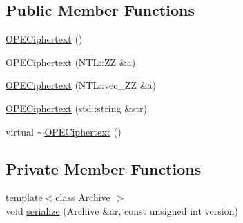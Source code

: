 \subsection*{Public Member Functions}
\begin{DoxyCompactItemize}
\item 
\hyperlink{classOPECiphertext_a03de322445edbdcd1439906f2d853dd0}{O\+P\+E\+Ciphertext} ()
\item 
\hyperlink{classOPECiphertext_a834af7de55af1ba2bb9621099dea4fa7}{O\+P\+E\+Ciphertext} (N\+T\+L\+::\+ZZ \&a)
\item 
\hyperlink{classOPECiphertext_af47076c8c0eb9cdccd0d3ad50140183d}{O\+P\+E\+Ciphertext} (N\+T\+L\+::vec\+\_\+\+ZZ \&a)
\item 
\hyperlink{classOPECiphertext_a8ec336e22de5f54c7dfbe5e4e82b7577}{O\+P\+E\+Ciphertext} (std\+::string \&str)
\item 
virtual \hyperlink{classOPECiphertext_a80e3d4bd7823830c1a26943e6a4959f9}{$\sim$\+O\+P\+E\+Ciphertext} ()
\end{DoxyCompactItemize}
\subsection*{Private Member Functions}
\begin{DoxyCompactItemize}
\item 
{\footnotesize template$<$class Archive $>$ }\\void \hyperlink{classOPECiphertext_a30351d3dd1b2ed7be3bd27abb0180784}{serialize} (Archive \&ar, const unsigned int version)
\end{DoxyCompactItemize}
